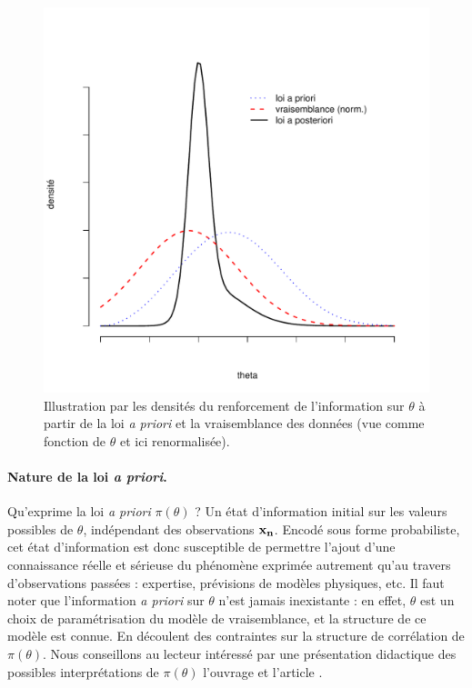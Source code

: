 \begin{figure}[h!]
\centering
\vspace{2cm}
\includegraphics[scale=0.56,natwidth=380,natheight=380]{figures/ex-bayes-1.pdf}
\caption{Illustration par les densit\'es du renforcement de l'information sur $\theta$ \`a partir de la loi {\it a priori} et la vraisemblance des donn\'ees (vue comme fonction de $\theta$ et ici renormalis\'ee). }
\label{illust-bayes}
\end{figure} 




\paragraph*{\bf Nature de la loi {\it a priori}.}
 Qu'exprime la loi {\it a priori} $\pi(\theta)$ ? Un \'etat d'information initial sur les valeurs possibles de $\theta$, ind\'ependant des observations ${\bf x_n}$. Encod\'e sous forme probabiliste, cet \'etat d'information est donc susceptible de permettre l'ajout d'une connaissance r\'eelle et s\'erieuse du ph\'enom\`ene exprim\'ee autrement  qu'au travers d'observations pass\'ees : expertise, pr\'evisions de mod\`eles physiques, etc. Il faut noter que l'information {\it a priori} sur $\theta$ n'est jamais inexistante : en effet, $\theta$ est un choix de param\'etrisation du mod\`ele de vraisemblance, et la structure de ce mod\`ele est connue. En d\'ecoulent des contraintes sur la structure de corr\'elation de $\pi(\theta)$. Nous conseillons au lecteur int\'eress\'e par une pr\'esentation didactique des possibles interpr\'etations de $\pi(\theta)$ l'ouvrage \cite{Parent2007} et l'article \cite{Pasanisi2012}. 
